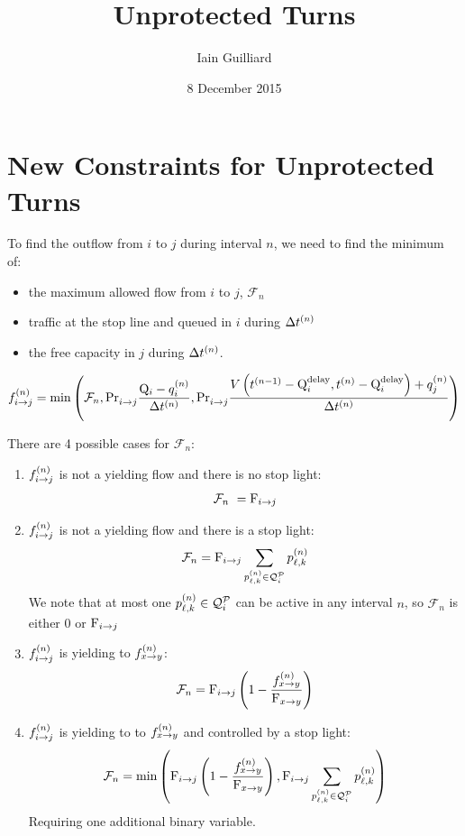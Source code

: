 \documentclass[a4paper]{article}
\newcommand{\Fmax}[1][n]{\ensuremath{\mathcal{F}_{#1}}\xspace}
\begin{document}
\title{Unprotected Turns}

\author{Iain Guilliard}
\date{8 December 2015}
\maketitle

\section{New Constraints for Unprotected Turns}
To find the outflow from $i$ to $j$ during interval $n$, we need to find the minimum of:
\begin{itemize}
\item  the maximum allowed flow from $i$ to $j$, $\Fmax$
\item traffic at the stop line and queued in $i$ during $\Delta t^{(n)}$
\item  the free capacity in $j$ during $\Delta t^{(n)}$.
\end{itemize}

\begin{align}
\f{i}{j} = \text{min}\left(\Fmax, \FTURN{i}{j} \frac{\QMAX{i} - \q{i}}{\DT},
\FTURN{i}{j} \frac{V\left(\tn[n-1] - \QDELAY{i},\tn - \QDELAY{i}\right) + \q{j}}{\DT}
\right)
\end{align}

There are 4 possible cases for $\Fmax$:
\begin{enumerate}
\item  $f_{i\to j}^{(n)}$ is not a yielding flow and there is no stop light:
\begin{align}
\Fmax\ = \FMAX{i}{j}
\end{align}

\item  $f_{i\to j}^{(n)}$ is not a yielding flow and there is a stop light:
\begin{align}
\Fmax = \FMAX{i}{j} \sum_{\p{\ell}{k} \in \QPset{i}}\p{\ell}{k}
\end{align}We note that at most one $p_{\ell,k}^{(n)} \in \mathcal{Q}_{i}^{\mathcal{P}}$ can be active in any interval $n$, so $\Fmax$ is either $0$ or $\mathrm{F}_{i\to j}$

\item  $f_{i\to j}^{(n)}$ is yielding to $f_{x\to y}^{(n)}$:
\begin{align}
\Fmax = \FMAX{i}{j} \left(1 - \frac{\f{x}{y}}{\FMAX{x}{y}}\right)
\end{align}

\item  $f_{i\to j}^{(n)}$ is yielding to to $f_{x\to y}^{(n)}$ and controlled by a stop light:
\begin{align}
\Fmax = \text{min}\left(
\FMAX{i}{j} \left(1 - \frac{\f{x}{y}}{\FMAX{x}{y}}\right),
\FMAX{i}{j} \sum_{\p{\ell}{k} \in \QPset{i}}\p{\ell}{k}
\right)
\end{align}
Requiring one additional binary variable.
\end{enumerate}
\end{document}
